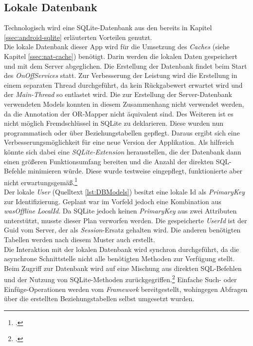 \subsection{Lokale Datenbank}
\label{ssec:nat-db}
Technologisch wird eine SQLite-Datenbank aus den bereits in Kapitel \ref{ssec:android-sqlite} erläuterten Vorteilen genutzt.\\
Die lokale Datenbank dieser App wird für die Umsetzung des \textit{Caches} (siehe Kapitel \ref{ssec:nat-cache}) benötigt. Darin werden die lokalen Daten gespeichert und mit dem Server abgeglichen.
Die Erstellung der Datenbank findet beim Start des \textit{OnOffServices} statt. Zur Verbesserung der Leistung wird die Erstellung in einem separaten Thread durchgeführt, da kein Rückgabewert erwartet wird und der \textit{Main-Thread} so entlastet wird. Die zur Erstellung der Server-Datenbank verwendeten Models konnten in diesem Zusammenhang nicht verwendet werden, da die Annotation der OR-Mapper nicht äquivalent sind. Des Weiteren ist es nicht möglich Fremdschlüssel in SQLite zu deklarieren. Diese wurden nun programmatisch oder über Beziehungstabellen gepflegt. Daraus ergibt sich eine Verbesserungsmöglichkeit für eine neue Version der Applikation. Als hilfreich könnte sich dabei eine \textit{SQLite-Extension} herausstellen, die der Datenbank dann einen größeren Funktionsumfang bereiten und die Anzahl der direkten SQL-Befehle minimieren würde. Diese wurde testweise eingepflegt, funktionierte aber nicht erwartungsgemäß.\footcite{Android-SQLiteExtension}\\

Der lokale \textit{User} (Quelltext \ref{lst:DBModels}) besitzt eine lokale Id als \textit{PrimaryKey} zur Identifizierung. Geplant war im Vorfeld jedoch eine Kombination aus \textit{wasOffline} \textit{LocalId}. Da SQLite jedoch keinen \textit{PrimaryKey} aus zwei Attributen unterstützt, musste dieser Plan verworfen werden. Die gespeicherte \textit{UserId} ist der Guid vom Server, der als \textit{Session}-Ersatz gehalten wird. Die anderen benötigten Tabellen werden nach diesem Muster auch erstellt.\\
Die Interaktion mit der lokalen Datenbank wird synchron durchgeführt, da die asynchrone Schnittstelle nicht alle benötigten Methoden zur Verfügung stellt. Beim Zugriff zur Datenbank wird auf eine Mischung aus direkten SQL-Befehlen und der Nutzung von SQLite-Methoden zurückgegriffen.\footcite[Vgl.]{Android-SQLiteORM} Einfache Such- oder Einfüge-Operationen werden vom \textit{Framework} bereitgestellt, wohingegen Abfragen über die erstellten Beziehungstabellen selbst umgesetzt wurden.
